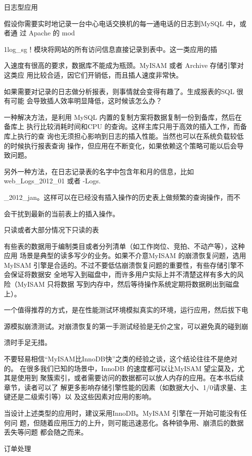 日志型应用

假设你需要实时地记录一台中心电话交换机的每一通电话的日志到MySQL 中，或者通
过 Apache 的 mod

1log\_sg！模块将网站的所有访问信息直接记录到表中。这一类应用的插

入速度有很高的要求，数据库不能成为瓶颈。MyISAM 或者 Archive 存储引擎对这类应
用比较合适，因它们开销低，而且插人速度非常快。

如果需要对记录的日志做分析报表，则事情就会变得有趣了。生成报表的SQL 很有可能
会导致插人效率明显降低，这时候该怎么办？

一种解决方法，是利用 MySQL 内置的复制方案将数据复制一份到备库，然后在备库上
执行比较消耗时间和CPU 的查询。这样主库只用于高效的插入工作，而备库上执行的查
询也无须担心影响到日志的插入性能。当然也可以在系统负载较低的时候执行报表查询
操作，但应用在不断变化，如果依赖这个策略可能以后会导致问题。

另外一种方法，在日志记录表的名字中包含年和月的信息，比如 web\_Logs\_2012\_01 或者
-Logs.

\_2012\_jan。这样可以在已经没有插入操作的历史表上做频繁的查询操作，而不

会干扰到最新的当前表上的插入操作。

只读或者大部分情况下只读的表

有些表的数据用于编制类目或者分列清单（如工作岗位、竞拍、不动产等），这种应用
场景是典型的读多写少的业务。如果不介意MyISAM 的崩溃恢复问题，选用MyISAM
引擎是合适的。不过不要低估崩溃恢复问题的重要性，有些存储引擎不会保证将数据安
全地写入到磁盘中，而许多用户实际上并不清楚这样有多大的风险（MyISAM 只将数据
写到内存中，然后等待操作系统定期将数据刷出到磁盘上）。

一个值得推荐的方式，是在性能测试环境模拟真实的环境，运行应用，然后拔下电

源模拟崩溃测试。对崩溃恢复的第一手测试经验是无价之宝，可以避免真的碰到崩

溃时手足无措。

不要轻易相信“MyISAM比InnoDB快”之类的经验之谈，这个结论往往不是绝对的。
在很多我们已知的场景中，InnoDB 的速度都可以让MyISAM 望尘莫及，尤其是使用到
聚簇索引，或者需要访问的数据都可以放人内存的应用。在本书后续章节，读者可以了
解更多影响存储引擎性能的因素（如数据大小、1/0请求量、主键还是二级索引等）以
及这些因素对应用的影响。

当设计上述类型的应用时，建议采用InnoDB。MyISAM 引擎在一开始可能没有任何问
题，但随着应用压力的上升，则可能迅速恶化。各种锁争用、崩溃后的数据丢失等问题
都会随之而来。

订单处理

